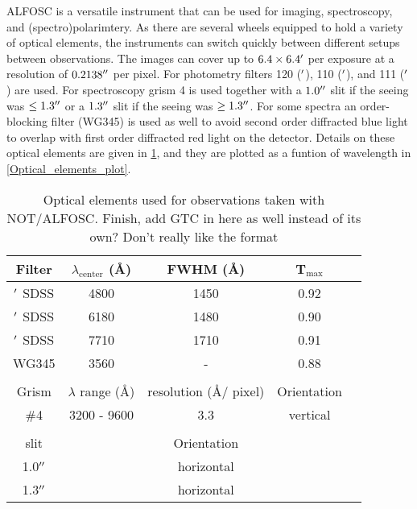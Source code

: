 \documentclass[a4paper,oneside,12pt, class=Latex/Classes/PhDthesisPSnPDF, crop=false]{standalone}
\begin{document}
ALFOSC is a versatile instrument that can be used for imaging, spectroscopy, and (spectro)polarimtery. As there are several wheels equipped to hold a variety of optical elements, the instruments can switch quickly between different setups between observations. The images can cover up to $6.4\times6.4^{\prime}$ per exposure at a resolution of $0.2138^{\prime\prime}$ per pixel. For photometry filters 120 (\ztfg$^{\prime}$), 110 (\ztfr$^{\prime}$), and 111 (\ztfi$^{\prime}$) are used. For spectroscopy grism 4 is used together with a $1.0^{\prime\prime}$ slit if the seeing was $\leq1.3^{\prime\prime}$ or a  $1.3^{\prime\prime}$ slit if the seeing was $\geq1.3^{\prime\prime}$. For some spectra an order-blocking filter (WG345) is used as well to avoid second order diffracted blue light to overlap with first order diffracted red light on the detector. Details on these optical elements are given in \ref{NOT_optic_elems}, and they are plotted as a funtion of wavelength in \ref{Optical_elements_plot}.

\begin{table}
    \centering
    \caption{Optical elements used for observations taken with NOT/ALFOSC. \color{red}Finish, add GTC in here as well instead of its own? Don't really like the format \color{black}}
    	\begin{tabular}{ccccc}
    		\hline
    		\hline
    		Filter & $\lambda_\text{center}$ (\AA) & FWHM (\AA) & T$_\text{max}$\\
    		\hline
    		\ztfg$^{\prime}$ SDSS & 4800 & 1450 & 0.92\\
    		\ztfr$^{\prime}$ SDSS & 6180 & 1480 & 0.90\\
    		\ztfi$^{\prime}$ SDSS & 7710 & 1710 & 0.91\\
    		WG345 & 3560 & - & 0.88\\
    		\\
    		\hline
    		\hline
    		Grism & $\lambda$ range (\AA) & resolution (\AA / pixel) & Orientation\\
    		\hline
    		\#4 & 3200 - 9600 & 3.3 & vertical\\
    		\\
    		\hline
    		\hline
    		slit & & Orientation\\
    		\hline
    		1.0$^{\prime\prime}$ && horizontal & \\
    		1.3$^{\prime\prime}$ && horizontal & \\
    		\hline
    	\end{tabular}
    \label{NOT_optic_elems}
\end{table}
\end{document}
